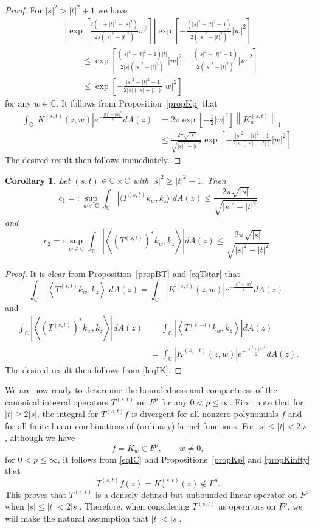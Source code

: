 \documentclass[reqno]{amsart}
\newtheorem{corollary}[theorem]{Corollary}
\newcommand{\C}{{\mathbb C}}
\newcommand{\inc}{\int_{\C}}
\begin{document}
\begin{proof}
For $|s|^2>|t|^2+1$ we have
\begin{align*}
&\left|\exp\left[\frac{t(1+|t|^2-|s|^2)}{2\overline{s}(|s|^2-|t|^2)}
w^2\right]\right|\exp\left[-\frac{(|s|^2-|t|^2-1)}
{2(|s|^2-|t|^2)}|w|^2\right]\\[8pt]
&\qquad\leq\exp\left[\frac{(|s|^2-|t|^2-1)|t|}{2|s|(|s|^2-|t|^2)}
|w|^2-\frac{(|s|^2-|t|^2-1)}{2(|s|^2-|t|^2)}|w|^2\right]\\[8pt]
&\qquad\leq\exp\left[-\frac{|s|^2-|t|^2-1}{2|s|(|s|+|t|)}|w|^2\right]
\end{align*}
for any $w\in\C$. It follows from Proposition~\ref{propKp} that
\begin{align}\label{IeqIK}
\inc\left| K^{(s,t)}(z,w)\right|e^{-\frac{|z|^2+|w|^2}{2}}dA(z)
&=2\pi\exp\left[-\frac{1}{2}|w|^2\right]\left\|K^{(s,t)}_w
\right\|_1\nonumber\\[8pt]
&\leq \frac{2\pi\sqrt{|s|}}{\sqrt{|s|^2-|t|^2}}
\exp\left[-\frac{|s|^2-|t|^2-1}{2|s|(|s|+|t|)}|w|^2\right].
\end{align}
The desired result then follows immediately.
\end{proof}

\begin{corollary}\label{corsup}
Let $(s, t)\in\C\times\C$ with $|s|^2\ge|t|^2+1$. Then
$$c_1=:\sup_{w\in\C}\inc\left|\langle T^{(s,t)}k_w, k_z\rangle
\right|dA(z)\leq\frac{2\pi\sqrt{|s|}}{\sqrt{|s|^2-|t|^2}}$$
and
$$c_2=:\sup_{w\in\C}\inc\left|\left\langle\left(T^{(s,t)}
\right)^{*}k_w, k_z\right\rangle\right| dA(z)\leq
\frac{2\pi\sqrt{|s|}}{\sqrt{|s|^2-|t|^2}}.$$
\end{corollary}

\begin{proof}
It is clear from Proposition~\ref{propBT} and \eqref{eqTstar} that
$$\inc\left|\left\langle T^{(s,t)}k_w, k_z\right\rangle\right|dA(z)
=\inc \left|K^{({s},t)}(z,w)\right|e^{-\frac{|z|^2+|w|^2}{2}}dA(z),$$
and
\begin{align*}
\inc\left|\left\langle \left(T^{(s,t)}\right)^{*}k_w, k_z\right\rangle\right|dA(z)
&=\inc\left|\left\langle T^{(\overline{s},-t)}k_w, k_z\right\rangle\right|dA(z)\\
&=\inc\left|K^{(\overline{s},-t)}(z,w)\right|e^{-\frac{|z|^2+|w|^2}{2}}dA(z).
\end{align*}
The desired result then follows from \eqref{IeqIK}.
\end{proof}

We are now ready to determine the boundedness and compactness of the
canonical integral operators $T^{(s,t)}$ on $F^p$ for any $0< p\leq\infty$.
First note that for $|t|\ge2|s|$, the integral for $T^{(s,t)}f$ is divergent for
all nonzero polynomials $f$ and for all finite linear combinations of (ordinary)
kernel functions. For $|s|\le|t|<2|s|$, although we have
$$f=K_w\in F^p, \qquad w\neq0,$$
for $0< p\leq\infty$, it follows from \eqref{eqIC} and
Propositions~\ref{propKp} and \ref{propKinfty} that
$$T^{(s,t)}f(z)=K_w^{(s,t)}(z)\notin F^p.$$
This proves that $T^{(s,t)}$ is a densely defined but unbounded linear
operator on $F^p$ when $|s|\le|t|<2|s|$. Therefore, when considering
$T^{(s,t)}$ as operators on $F^p$, we will make the natural assumption
that $|t|<|s|$.
\end{document}
